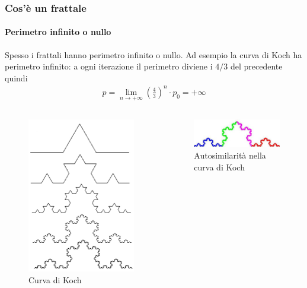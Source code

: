 \documentclass{beamer}
\begin{document}
		\begin{frame}
			\frametitle{Cos'è un frattale}
			\framesubtitle{Perimetro infinito o nullo}
			Spesso i frattali hanno perimetro infinito o nullo.
			Ad esempio la curva di Koch ha perimetro infinito: a ogni iterazione il perimetro diviene i $4/3$ del precedente quindi
			\begin{gather*}
				p = \lim_{n \rightarrow + \infty} \left(\frac{4}{3} \right)^n \cdot p_0 = + \infty
			\end{gather*}
			\begin{columns}
				\begin{column}{0.5\textwidth}
					\begin{figure}[h]
						\centering
						\includegraphics[width=0.5\linewidth]{"../Curva di Koch/koch"}
						\caption{Curva di Koch}
						\label{fig:curva_koch}
					\end{figure}
				\end{column}
				\begin{column}{0.5\textwidth}
					\begin{figure}[h]
						\centering
						\includegraphics[width=0.7\linewidth]{"../Curva di Koch/kochcolori"}
						\caption{Autosimilarità nella curva di Koch}
						\label{fig:koch_autosimile}
					\end{figure}
				\end{column}
			\end{columns}
		\end{frame}
\end{document}
